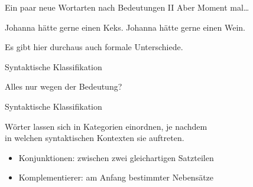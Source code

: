 \begin{frame}
  {Ein paar neue Wortarten nach Bedeutungen II}
  \pause
  Aber Moment mal\dots\\
  \pause
  \Zeile
  \begin{exe}
   \ex
   \begin{xlist}
   \end{xlist}
    \pause
    \ex
    \begin{xlist}
      \ex Johanna hätte gerne \alert{einen Keks}.
      \ex Johanna hätte gerne \alert{einen Wein}.
    \end{xlist}
  \end{exe}
  \pause
  \Zeile
  Es gibt hier durchaus auch \alert{formale} Unterschiede.
\end{frame}


\begin{frame}
  {Syntaktische Klassifikation}
  \pause
  \begin{exe}
    \ex
    \begin{xlist}
      \pause
      \pause
      \pause
    \end{xlist}
    \pause
    \Zeile
    \ex
    \begin{xlist}
      \pause
    \end{xlist}
  \end{exe}
    \pause
    \Zeile
    Alles nur wegen der Bedeutung?
\end{frame}

\begin{frame}
  {Syntaktische Klassifikation}
  \pause
  \begin{center}
    \Large Wörter lassen sich in Kategorien einordnen, je nachdem\\
    \alert{in welchen syntaktischen Kontexten sie auftreten}.
  \end{center}
  \Zeile
  \pause
  \begin{itemize}[<+->]
    \item Konjunktionen: zwischen zwei gleichartigen Satzteilen
    \item Komplementierer: am Anfang bestimmter Nebensätze
  \end{itemize}
\end{frame}



